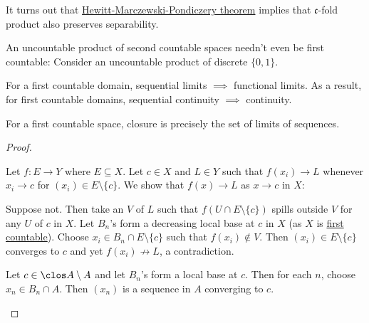 	\begin{rmk}
		It turns out that \href{https://math.stackexchange.com/a/526460/673223}{Hewitt-Marczewski-Pondiczery theorem} implies that $\mathfrak c$-fold product also preserves separability.
		
		An uncountable product of second countable spaces needn't even be first countable: Consider an uncountable product of discrete $\{0, 1\}$.
	\end{rmk}
	
	
	\begin{prp}\label{PRP: continuity and closure in first countable}
		\leavevmode
		\begin{mylist}
			\item\label{PRPi: continuity and closure in first countable} For a first countable domain, sequential limits $\implies$ functional limits. As a result, for first countable domains, sequential continuity $\implies$ continuity.
			
			\item For a first countable space, closure is precisely the set of limits of sequences.
		\end{mylist}
	\end{prp}
	
	\begin{proof}
		\begin{mylist}
			\item Let $f\colon E\to Y$ where $E\subseteq X$. Let $c\in X$ and $L\in Y$ such that $f(x_i)\to L$ whenever $x_i\to c$ for $(x_i)\in E\setminus\{c\}$. We show that $f(x)\to L$ as $x\to c$ in $X$:
			\begin{subproof}
				Suppose not. Then take an \onbd $V$ of $L$ such that $f(U\cap E\setminus\{c\})$ spills outside $V$ for any \onbd $U$ of $c$ in $X$. Let $B_n$'s form a decreasing local base at $c$ in $X$ (as $X$ is \uline{first countable}). Choose $x_i\in B_n\cap E\setminus\{c\}$ such that $f(x_i)\notin V$. Then $(x_i)\in E\setminus\{c\}$ converges to $c$ and yet $f(x_i)\not\to L$, a contradiction.
			\end{subproof}
			
			\item Let $c\in\clos A\setminus A$ and let $B_n$'s form a local base at $c$. Then for each $n$, choose $x_n\in B_n\cap A$. Then $(x_n)$ is a sequence in $A$ converging to $c$.\qedhere
		\end{mylist}
	\end{proof}
	
